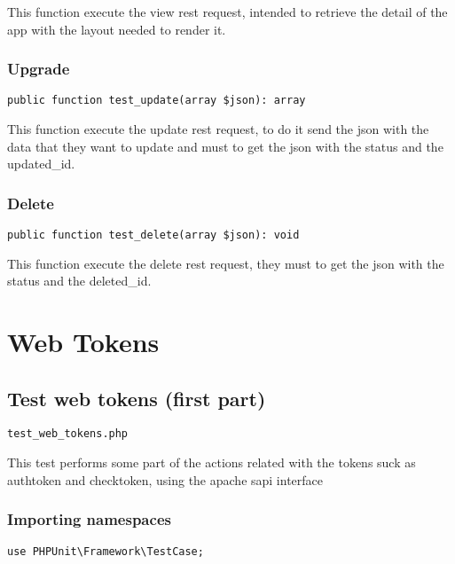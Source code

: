 \documentclass[a4paper]{article}
\begin{document}
This function execute the view rest request, intended to retrieve the detail
of the app with the layout needed to render it.

\hypertarget{toc448}{}
\subsubsection{Upgrade}

\begin{lstlisting}
public function test_update(array $json): array
\end{lstlisting}

This function execute the update rest request, to do it send the json with
the data that they want to update and must to get the json with the status
and the updated\_id.

\hypertarget{toc449}{}
\subsubsection{Delete}

\begin{lstlisting}
public function test_delete(array $json): void
\end{lstlisting}

This function execute the delete rest request, they must to get the json
with the status and the deleted\_id.


\hypertarget{toc450}{}
\section{Web Tokens}

\hypertarget{toc451}{}
\subsection{Test web tokens (first part)}

\begin{lstlisting}
test_web_tokens.php
\end{lstlisting}

This test performs some part of the actions related with the tokens suck
as authtoken and checktoken, using the apache sapi interface

\hypertarget{toc452}{}
\subsubsection{Importing namespaces}

\begin{lstlisting}
use PHPUnit\Framework\TestCase;
\end{lstlisting}
\end{document}
